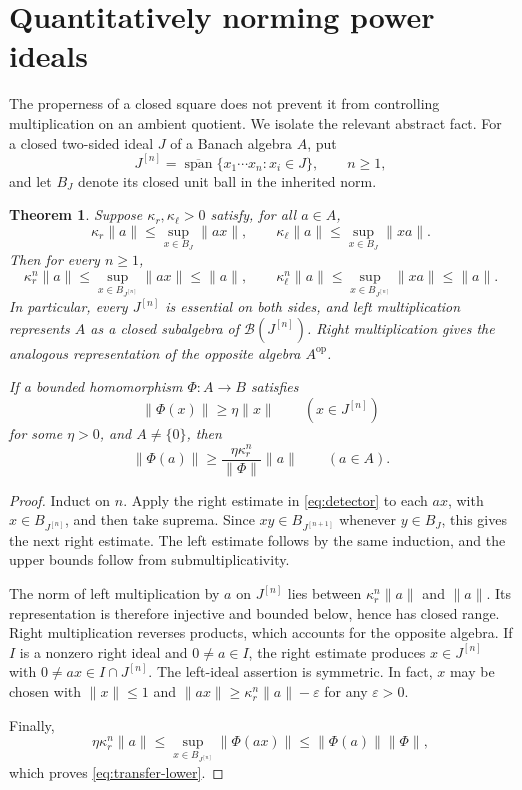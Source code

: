 \documentclass[11pt,reqno]{amsart}
\newtheorem{theorem}{Theorem}[section]
\theoremstyle{definition}
\theoremstyle{remark}
\newcommand{\B}{\mathcal B}
\newcommand{\clspan}{\overline{\operatorname{span}}}
\begin{document}
\section{Quantitatively norming power ideals}\label{sec:norming}

The properness of a closed square does not prevent it from controlling multiplication on an ambient quotient. We isolate the relevant abstract fact. For a closed two-sided ideal $J$ of a Banach algebra $A$, put
\[
 J^{[n]}=\clspan\{x_1\cdots x_n:x_i\in J\},\qquad n\geq1,
\]
and let $B_J$ denote its closed unit ball in the inherited norm.

\begin{theorem}\label{thm:norming}
Suppose $\kappa_r,\kappa_\ell>0$ satisfy, for all $a\in A$,
\begin{equation}\label{eq:detector}
 \kappa_r\|a\|\leq\sup_{x\in B_J}\|ax\|,\qquad
 \kappa_\ell\|a\|\leq\sup_{x\in B_J}\|xa\|.
\end{equation}
Then for every $n\geq1$,
\begin{equation}\label{eq:power-norming}
 \kappa_r^n\|a\|\leq\sup_{x\in B_{J^{[n]}}}\|ax\|\leq\|a\|,
 \qquad
 \kappa_\ell^n\|a\|\leq\sup_{x\in B_{J^{[n]}}}\|xa\|\leq\|a\|.
\end{equation}
In particular, every $J^{[n]}$ is essential on both sides, and left multiplication represents $A$ as a closed subalgebra of $\B(J^{[n]})$. Right multiplication gives the analogous representation of the opposite algebra $A^{\mathrm{op}}$.

If a bounded homomorphism $\Phi:A\to B$ satisfies
\[
 \|\Phi(x)\|\geq\eta\|x\|\qquad(x\in J^{[n]})
\]
for some $\eta>0$, and $A\ne\{0\}$, then
\begin{equation}\label{eq:transfer-lower}
 \|\Phi(a)\|\geq\frac{\eta\kappa_r^n}{\|\Phi\|}\|a\|
 \qquad(a\in A).
\end{equation}
\end{theorem}
\begin{proof}
Induct on $n$. Apply the right estimate in \eqref{eq:detector} to each $ax$, with $x\in B_{J^{[n]}}$, and then take suprema. Since $xy\in B_{J^{[n+1]}}$ whenever $y\in B_J$, this gives the next right estimate. The left estimate follows by the same induction, and the upper bounds follow from submultiplicativity.

The norm of left multiplication by $a$ on $J^{[n]}$ lies between $\kappa_r^n\|a\|$ and $\|a\|$. Its representation is therefore injective and bounded below, hence has closed range. Right multiplication reverses products, which accounts for the opposite algebra. If $I$ is a nonzero right ideal and $0\ne a\in I$, the right estimate produces $x\in J^{[n]}$ with $0\ne ax\in I\cap J^{[n]}$. The left-ideal assertion is symmetric. In fact, $x$ may be chosen with $\|x\|\leq1$ and $\|ax\|\geq\kappa_r^n\|a\|-\varepsilon$ for any $\varepsilon>0$.

Finally,
\[
 \eta\kappa_r^n\|a\|
 \leq\sup_{x\in B_{J^{[n]}}}\|\Phi(ax)\|
 \leq\|\Phi(a)\|\|\Phi\|,
\]
which proves \eqref{eq:transfer-lower}.
\end{proof}
\end{document}
